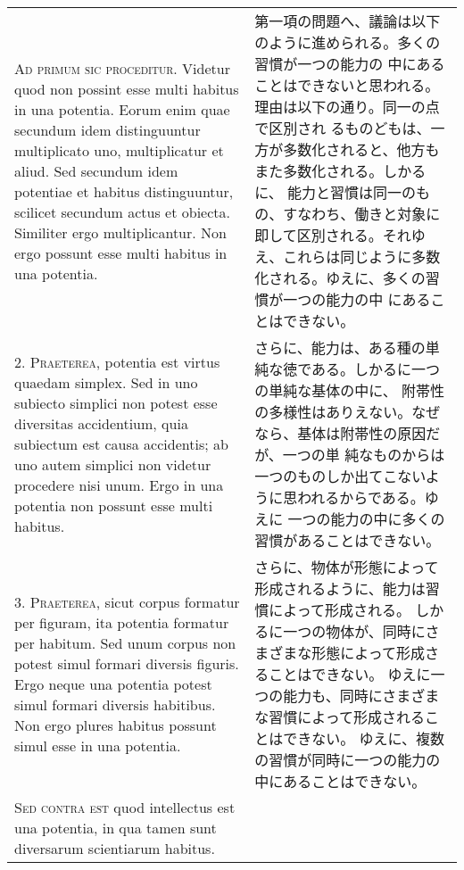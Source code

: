 \documentclass[10pt]{jsarticle}
\begin{document}
\begin{longtable}{p{21em}p{21em}}

{\scshape Ad primum sic proceditur}. Videtur quod non possint esse
multi habitus in una potentia. Eorum enim quae secundum idem
distinguuntur multiplicato uno, multiplicatur et aliud. Sed secundum
idem potentiae et habitus distinguuntur, scilicet secundum actus et
obiecta. Similiter ergo multiplicantur. Non ergo possunt esse multi
habitus in una potentia.

&

第一項の問題へ、議論は以下のように進められる。多くの習慣が一つの能力の
中にあることはできないと思われる。理由は以下の通り。同一の点で区別され
るものどもは、一方が多数化されると、他方もまた多数化される。しかるに、
能力と習慣は同一のもの、すなわち、働きと対象に即して区別される。それゆ
え、これらは同じように多数化される。ゆえに、多くの習慣が一つの能力の中
にあることはできない。

\\

2. {\scshape Praeterea}, potentia est virtus quaedam simplex. Sed in
uno subiecto simplici non potest esse diversitas accidentium, quia
subiectum est causa accidentis; ab uno autem simplici non videtur
procedere nisi unum. Ergo in una potentia non possunt esse multi
habitus.

&

さらに、能力は、ある種の単純な徳である。しかるに一つの単純な基体の中に、
附帯性の多様性はありえない。なぜなら、基体は附帯性の原因だが、一つの単
純なものからは一つのものしか出てこないように思われるからである。ゆえに
一つの能力の中に多くの習慣があることはできない。

\\

3. {\scshape Praeterea}, sicut corpus formatur per figuram, ita
potentia formatur per habitum. Sed unum corpus non potest simul
formari diversis figuris. Ergo neque una potentia potest simul formari
diversis habitibus. Non ergo plures habitus possunt simul esse in una
potentia.

&

さらに、物体が形態によって形成されるように、能力は習慣によって形成される。
しかるに一つの物体が、同時にさまざまな形態によって形成さることはできない。
ゆえに一つの能力も、同時にさまざまな習慣によって形成されることはできない。
ゆえに、複数の習慣が同時に一つの能力の中にあることはできない。

\\

{\scshape Sed contra est} quod intellectus est una potentia, in qua
tamen sunt diversarum scientiarum habitus.


\end{longtable}
\end{document}
